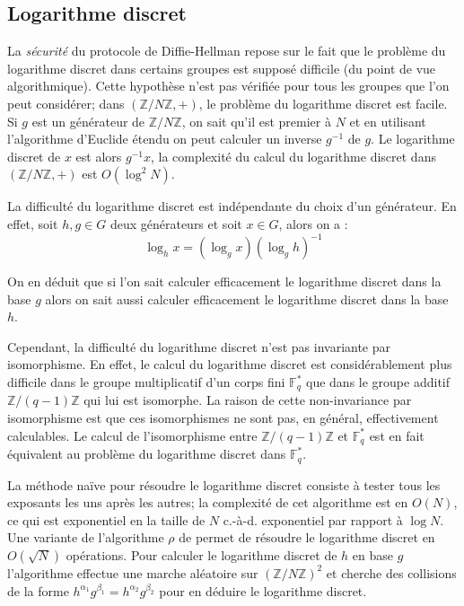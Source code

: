 \documentclass[a4paper]{article}
\theoremstyle{definition}
\theoremstyle{remark}
\numberwithin{equation}{section}
\begin{document}
\subsection{Logarithme discret}
La \emph{sécurité} du protocole de Diffie-Hellman repose sur le fait que le problème du logarithme discret dans certains groupes est supposé difficile (du point de vue algorithmique). Cette hypothèse n'est pas vérifiée pour tous les groupes que l'on peut considérer; dans $(\mathbb{Z}/N\mathbb{Z},+)$, le problème du logarithme discret est facile. Si $g$ est un générateur de $\mathbb{Z}/N\mathbb{Z}$, on sait qu'il est premier à $N$ et en utilisant l'algorithme d'Euclide étendu on peut calculer un inverse $g^{-1}$ de $g$. Le logarithme discret de $x$ est alors $g^{-1}x$, la complexité du calcul du logarithme discret dans $(\mathbb{Z}/N\mathbb{Z},+)$ est $O(\log^2N)$.

La difficulté du logarithme discret est indépendante du choix d'un générateur. En effet, soit $h,g \in G$ deux générateurs et soit $x \in G$, alors on a :
$$\log_h x = (\log_g x)(\log_g h)^{-1}$$

On en déduit que si l'on sait calculer efficacement le logarithme discret dans la base $g$ alors on sait aussi calculer efficacement le logarithme discret dans la base $h$.

Cependant, la difficulté du logarithme discret n'est pas invariante par isomorphisme. En effet, le calcul du logarithme discret est considérablement plus difficile dans le groupe multiplicatif d'un corps fini $\mathbb{F}^*_q$ que dans le groupe additif $\mathbb{Z}/(q-1)\mathbb{Z}$ qui lui est isomorphe. La raison de cette non-invariance par isomorphisme est que ces isomorphismes ne sont pas, en général, effectivement
calculables. Le calcul de l'isomorphisme entre $\mathbb{Z}/(q-1)\mathbb{Z}$ et $\mathbb{F}^*_q$ est en fait équivalent au problème du logarithme discret dans $\mathbb{F}_q^*$.

La méthode naïve pour résoudre le logarithme discret consiste à tester tous les exposants les uns après les autres; la complexité de cet algorithme est en $O(N)$, ce qui est exponentiel en la taille de $N$ c.-à-d. exponentiel par rapport à $\log N$. Une variante de l'algorithme $\rho$ de \citet{pollard} permet de résoudre le logarithme discret en $O(\sqrt{N})$ opérations. Pour calculer le logarithme discret de $h$ en base $g$ l'algorithme effectue une marche aléatoire sur $(\mathbb{Z}/N\mathbb{Z})^2$ et cherche des collisions de la forme $h^{\alpha_1}g^{\beta_1} = h^{\alpha_2}g^{\beta_2}$ pour en déduire le logarithme discret.
\end{document}

